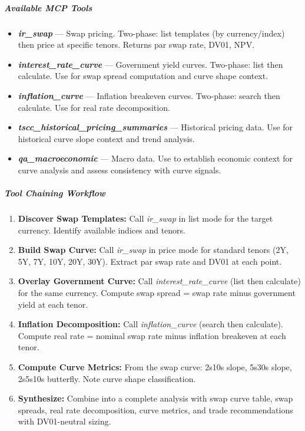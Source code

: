 \documentclass[11pt]{article}
\begin{document}
\subparagraph{Available MCP Tools}\mbox{}\par

\begin{itemize}[leftmargin=*,itemsep=2pt,topsep=2pt]
\item {} \textbf{\emph{ir\_\allowbreak{}swap}} — Swap pricing. Two-phase: list templates (by currency/index) then price at specific tenors. Returns par swap rate, DV01, NPV.
\item {} \textbf{\emph{interest\_\allowbreak{}rate\_\allowbreak{}curve}} — Government yield curves. Two-phase: list then calculate. Use for swap spread computation and curve shape context.
\item {} \textbf{\emph{inflation\_\allowbreak{}curve}} — Inflation breakeven curves. Two-phase: search then calculate. Use for real rate decomposition.
\item {} \textbf{\emph{tscc\_\allowbreak{}historical\_\allowbreak{}pricing\_\allowbreak{}summaries}} — Historical pricing data. Use for historical curve slope context and trend analysis.
\item {} \textbf{\emph{qa\_\allowbreak{}macroeconomic}} — Macro data. Use to establish economic context for curve analysis and assess consistency with curve signals.
\end{itemize}

\subparagraph{Tool Chaining Workflow}\mbox{}\par

\begin{enumerate}[leftmargin=*,itemsep=2pt,topsep=2pt]
\item {} \textbf{Discover Swap Templates:} Call \emph{ir\_\allowbreak{}swap} in list mode for the target currency. Identify available indices and tenors.
\item {} \textbf{Build Swap Curve:} Call \emph{ir\_\allowbreak{}swap} in price mode for standard tenors (2Y, 5Y, 7Y, 10Y, 20Y, 30Y). Extract par swap rate and DV01 at each point.
\item {} \textbf{Overlay Government Curve:} Call \emph{interest\_\allowbreak{}rate\_\allowbreak{}curve} (list then calculate) for the same currency. Compute swap spread = swap rate minus government yield at each tenor.
\item {} \textbf{Inflation Decomposition:} Call \emph{inflation\_\allowbreak{}curve} (search then calculate). Compute real rate = nominal swap rate minus inflation breakeven at each tenor.
\item {} \textbf{Compute Curve Metrics:} From the swap curve: 2s10s slope, 5s30s slope, 2s5s10s butterfly. Note curve shape classification.
\item {} \textbf{Synthesize:} Combine into a complete analysis with swap curve table, swap spreads, real rate decomposition, curve metrics, and trade recommendations with DV01-neutral sizing.
\end{enumerate}
\end{document}
